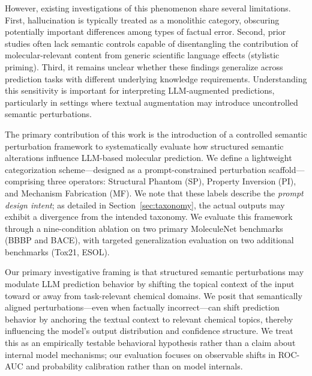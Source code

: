 However, existing investigations of this phenomenon share several limitations. First, hallucination is typically treated as a monolithic category, obscuring potentially important differences among types of factual error. Second, prior studies often lack semantic controls capable of disentangling the contribution of molecular-relevant content from generic scientific language effects (stylistic priming). Third, it remains unclear whether these findings generalize across prediction tasks with different underlying knowledge requirements. Understanding this sensitivity is important for interpreting LLM-augmented predictions, particularly in settings where textual augmentation may introduce uncontrolled semantic perturbations.

The primary contribution of this work is the introduction of a controlled semantic perturbation framework to systematically evaluate how structured semantic alterations influence LLM-based molecular prediction. We define a lightweight categorization scheme---designed as a prompt-constrained perturbation scaffold---comprising three operators: Structural Phantom (SP), Property Inversion (PI), and Mechanism Fabrication (MF). We note that these labels describe the \textit{prompt design intent}; as detailed in Section~\ref{sec:taxonomy}, the actual outputs may exhibit a divergence from the intended taxonomy. We evaluate this framework through a nine-condition ablation on two primary MoleculeNet benchmarks (BBBP and BACE), with targeted generalization evaluation on two additional benchmarks (Tox21, ESOL).

Our primary investigative framing is that structured semantic 
perturbations may modulate LLM prediction behavior by shifting 
the topical context of the input toward or away from 
task-relevant chemical domains. We posit that semantically 
aligned perturbations---even when factually incorrect---can 
shift prediction behavior by anchoring the textual context 
to relevant chemical topics, thereby influencing the model's 
output distribution and confidence structure. We treat this 
as an empirically testable behavioral hypothesis rather than 
a claim about internal model mechanisms; our evaluation 
focuses on observable shifts in ROC-AUC and probability 
calibration rather than on model internals.

